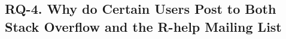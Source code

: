 \documentclass{sig-alternate-05-2015}
\begin{document}






\subsection{RQ-4. Why do Certain Users Post to Both Stack Overflow and the R-help Mailing List}
\end{document}
